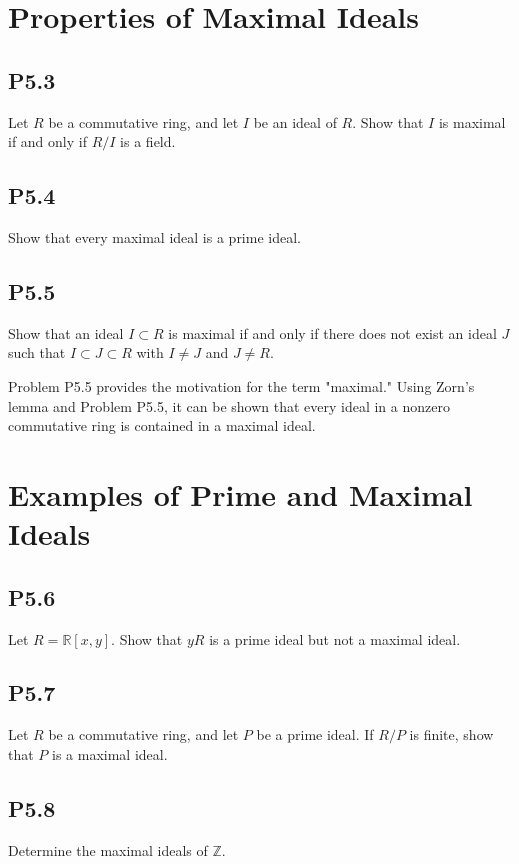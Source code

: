 \documentclass[lang=cn,11pt]{template}
\begin{document}
\section{Properties of Maximal Ideals}

\subsection*{P5.3} Let \( R \) be a commutative ring, and let \( I \) be an ideal of \( R \). Show that \( I \) is maximal if and only if \( R/I \) is a field.

\subsection*{P5.4} Show that every maximal ideal is a prime ideal.

\subsection*{P5.5} Show that an ideal \( I \subset R \) is maximal if and only if there does not exist an ideal \( J \) such that \( I \subset J \subset R \) with \( I \neq J \) and \( J \neq R \).

\begin{remark}
Problem P5.5 provides the motivation for the term "maximal." Using Zorn’s lemma and Problem P5.5, it can be shown that every ideal in a nonzero commutative ring is contained in a maximal ideal.
\end{remark}

\section{Examples of Prime and Maximal Ideals}

\subsection*{P5.6} Let \( R = \mathbb{R}[x, y] \). Show that \( yR \) is a prime ideal but not a maximal ideal.

\subsection*{P5.7} Let \( R \) be a commutative ring, and let \( P \) be a prime ideal. If \( R/P \) is finite, show that \( P \) is a maximal ideal.

\subsection*{P5.8} Determine the maximal ideals of \( \mathbb{Z} \).
\end{document}
